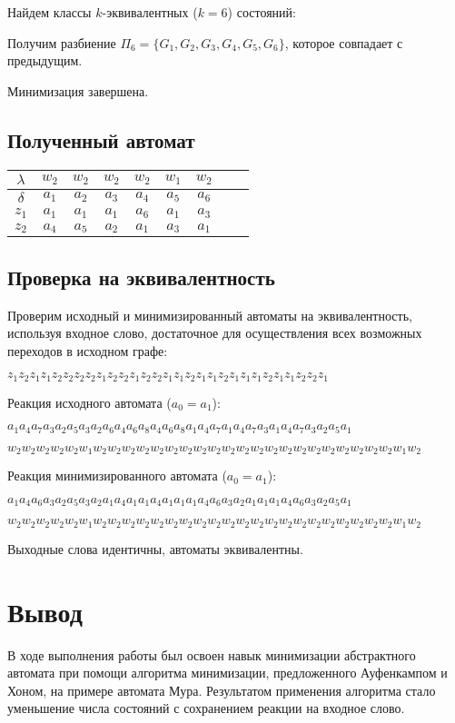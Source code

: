 \documentclass[listings]{labreport}
\begin{document}
Найдем классы $k$-эквивалентных ($k=6$) состояний:

Получим разбиение $\Pi_6 = \{G_1, G_2, G_3, G_4, G_5, G_6\}$, которое
совпадает с предыдущим.

Минимизация завершена.

\subsection*{Полученный автомат}

\begin{tabular}{|*{9}{c|}}
\hline
$\lambda$ & $w_2$ & $w_2$ & $w_2$ & $w_2$ & $w_1$ & $w_2$  \\\hline
$\delta$  & $a_1$ & $a_2$ & $a_3$ & $a_4$ & $a_5$ & $a_6$ \\\hline
$z_1$     & $a_1$ & $a_1$ & $a_1$ & $a_6$ & $a_1$ & $a_3$ \\\hline
$z_2$     & $a_4$ & $a_5$ & $a_2$ & $a_1$ & $a_3$ & $a_1$ \\\hline
\end{tabular}

\subsection*{Проверка на эквивалентность}

Проверим исходный и минимизированный автоматы на эквивалентность,
используя входное слово, достаточное для осуществления всех возможных
переходов в исходном графе:

$z_1z_2z_1z_1z_2z_2z_2z_2z_1z_2z_2z_1z_2z_2z_1z_1z_2z_1z_1z_2z_1z_1z_1z_2z_1z_1z_2z_2z_1$

Реакция исходного автомата ($a_0 = a_1$):

$a_1a_4a_7a_3a_2a_5a_3a_2a_6a_4a_6a_8a_4a_6a_8a_1a_4a_7a_1a_4a_7a_3a_1a_4a_7a_3a_2a_5a_1$

$w_2w_2w_2w_2w_2w_1w_2w_2w_2w_2w_2w_2w_2w_2w_2w_2w_2w_2w_2w_2w_2w_2w_2w_2w_2w_2w_2w_1w_2$

Реакция минимизированного автомата ($a_0 = a_1$):

$a_1a_4a_6a_3a_2a_5a_3a_2a_1a_4a_1a_1a_4a_1a_1a_1a_4a_6a_3a_2a_1a_1a_1a_4a_6a_3a_2a_5a_1$

$w_2w_2w_2w_2w_2w_1w_2w_2w_2w_2w_2w_2w_2w_2w_2w_2w_2w_2w_2w_2w_2w_2w_2w_2w_2w_2w_2w_1w_2$

Выходные слова идентичны, автоматы эквивалентны.

\section*{Вывод}

В ходе выполнения работы был освоен навык минимизации абстрактного автомата при помощи
алгоритма минимизации, предложенного Ауфенкампом и Хоном, на примере автомата Мура.
Результатом применения алгоритма стало уменьшение числа состояний с сохранением
реакции на входное слово.
\end{document}
